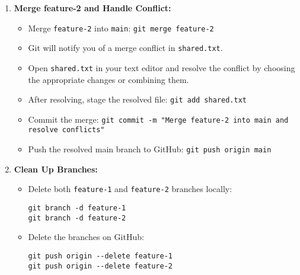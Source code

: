 \documentclass[a4paper,12pt]{report}
\begin{document}
\begin{enumerate}[label=\arabic*.]
    \item \textbf{Merge feature-2 and Handle Conflict:}
    \begin{itemize}
        \item Merge \texttt{feature-2} into \texttt{main}: \texttt{git merge feature-2}
        \item Git will notify you of a merge conflict in \texttt{shared.txt}.
        \item Open \texttt{shared.txt} in your text editor and resolve the conflict by choosing the appropriate changes or combining them.
        \item After resolving, stage the resolved file: \texttt{git add shared.txt}
        \item Commit the merge: \texttt{git commit -m "Merge feature-2 into main and resolve conflicts"}
        \item Push the resolved main branch to GitHub: \texttt{git push origin main}
    \end{itemize}

    \item \textbf{Clean Up Branches:}
    \begin{itemize}
        \item Delete both \texttt{feature-1} and \texttt{feature-2} branches locally:
        \begin{verbatim}
git branch -d feature-1
git branch -d feature-2
        \end{verbatim}
        \item Delete the branches on GitHub:
        \begin{verbatim}
git push origin --delete feature-1
git push origin --delete feature-2
        \end{verbatim}
    \end{itemize}
\end{enumerate}
\newpage
\end{document}
